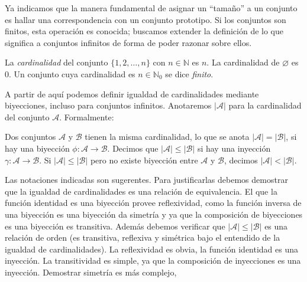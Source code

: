   Ya indicamos que la manera fundamental de asignar un ``tamaño'' a un conjunto
  es hallar una correspondencia con un conjunto prototipo.
  Si los conjuntos son finitos,
  esta operación es conocida;
  buscamos extender la definición de lo que significa a conjuntos infinitos
  de forma de poder razonar sobre ellos.
  \begin{definition}
    La \emph{cardinalidad} del conjunto
    \(\{1, 2, \dotsc, n\}\) con \(n \in \mathbb{N}\)
    es \(n\).
    La cardinalidad de \(\varnothing\) es \(0\).
    Un conjunto cuya cardinalidad es \(n \in \mathbb{N}_0\)
    se dice \emph{finito}.%
  \end{definition}
  A partir de aquí podemos definir igualdad de cardinalidades
  mediante biyecciones,
  incluso para conjuntos infinitos.%
  Anotaremos \(\lvert \mathcal{A} \rvert\)
  para la cardinalidad del conjunto \(\mathcal{A}\).
  Formalmente:
  \begin{definition}
    Dos conjuntos \(\mathcal{A}\) y \(\mathcal{B}\)
    tienen la misma cardinalidad,
    lo que se anota
      \(\lvert \mathcal{A} \rvert = \lvert \mathcal{B} \rvert\),
    si hay una biyección
      \(\phi: \mathcal{A} \rightarrow \mathcal{B}\).
    Decimos que
      \(\lvert \mathcal{A} \rvert \le \lvert \mathcal{B} \rvert\)
    si hay una inyección
      \(\gamma: \mathcal{A} \rightarrow \mathcal{B}\).
    Si \(\lvert \mathcal{A} \rvert \le \lvert \mathcal{B} \rvert\)
    pero no existe biyección
    entre \(\mathcal{A}\) y \(\mathcal{B}\),
    decimos
      \(\lvert \mathcal{A} \rvert < \lvert \mathcal{B} \rvert\).
  \end{definition}
  Las notaciones indicadas son sugerentes.
  Para justificarlas debemos demostrar que
  la igualdad de cardinalidades
  es una relación de equivalencia.%
  El que la función identidad es una biyección provee reflexividad,
  como la función inversa de una biyección
  es una biyección da simetría
  y ya que la composición de biyecciones
  es una biyección es transitiva.
  Además debemos verificar
  que \(\lvert \mathcal{A} \rvert \le \lvert \mathcal{B} \rvert\)
  es una relación de orden%
  (es transitiva,
   reflexiva y simétrica
   bajo el entendido de la igualdad de cardinalidades).
  La reflexividad es obvia,
  la función identidad es una inyección.
  La transitividad es simple,
  ya que la composición de inyecciones es una inyección.
  Demostrar simetría es más complejo,
